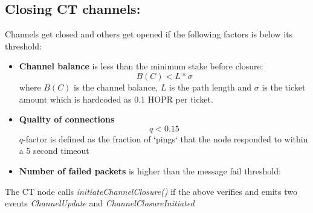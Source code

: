 \subsection{Closing CT channels:}
Channels get closed and others get opened if the following factors is below its threshold:
  \begin{itemize}
      \item \textbf{Channel balance} is less than the minimum stake before closure:
      $$B(C) < L * \sigma$$
      where $B(C)$ is the channel balance, $L$ is the path length and $\sigma$ is the ticket amount which is hardcoded as 0.1 HOPR per ticket.
      \item \textbf{Quality of connections}
      $$q < 0.15$$ $q$-factor is defined as the fraction of `pings` that the node responded to within a 5 second timeout
      \item \textbf{Number of failed packets} is higher than the message fail threshold:
      $$ $$
  \end{itemize}
The CT node calls \textit{initiateChannelClosure()} if the above verifies and emits two events \textit{ChannelUpdate} and \textit{ChannelClosureInitiated}
